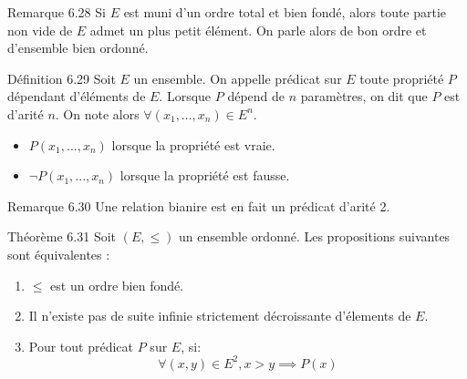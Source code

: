 \documentclass{article}
\begin{document}
\begin{adjustwidth}{-3cm}{-3cm}
    Remarque 6.28
    Si $E$ est muni d'un ordre total et bien fondé, alors toute partie non vide de $E$ admet un plus petit élément. On parle alors de bon ordre et d'ensemble bien ordonné.

    Définition 6.29
    Soit $E$ un ensemble. On appelle prédicat sur $E$ toute propriété $P$ dépendant d'éléments de $E$.
    Lorsque $P$ dépend de $n$ paramètres, on dit que $P$ est d'arité $n$. On note alors $\forall (x_1, \ldots, x_n) \in E^n$. \begin{itemize}
        \item $P(x_1,...,x_n)$ lorsque la propriété est vraie.
        \item $\lnot P(x_1,...,x_n)$ lorsque la propriété est fausse.
    \end{itemize}

    Remarque 6.30
    Une relation bianire est en fait un prédicat d'arité 2.

    Théorème 6.31
    Soit $(E,\leq)$ un ensemble ordonné. Les propositions suivantes sont équivalentes : \begin{enumerate}
        \item $\leq$ est un ordre bien fondé.
        \item Il n'existe pas de suite infinie strictement décroissante d'élements de $E$.
        \item Pour tout prédicat $P$ sur $E$, si: $$\forall (x,y) \in E^2, x > y \implies P(x)$$
    \end{enumerate}


\end{adjustwidth}
\end{document}
